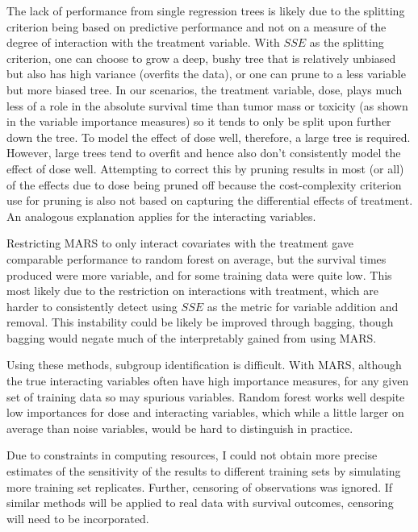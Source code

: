 \documentclass[12pt]{article}
\begin{document}
The lack of performance from single regression trees is likely due to the splitting criterion being based on predictive performance and not on a measure of the degree of interaction with the treatment variable. With $SSE$ as the splitting criterion, one can choose to grow a deep, bushy tree that is relatively unbiased but also has high variance (overfits the data), or one can prune to a less variable but more biased tree. In our scenarios, the treatment variable, dose, plays much less of a role in the absolute survival time than tumor mass or toxicity (as shown in the variable importance measures) so it tends to only be split upon further down the tree. To model the effect of dose well, therefore, a large tree is required. However, large trees tend to overfit and hence also don't consistently model the effect of dose well. Attempting to correct this by pruning results in most (or all) of the effects due to dose being pruned off because the cost-complexity criterion use for pruning is also not based on capturing the differential effects of treatment. An analogous explanation applies for the interacting variables.

Restricting MARS to only interact covariates with the treatment gave comparable performance to random forest on average, but the survival times produced were more variable, and for some training data were quite low. This most likely due to the restriction on interactions with treatment, which are harder to consistently detect using $SSE$ as the metric for variable addition and removal. This instability could be likely be improved through bagging, though bagging would negate much of the interpretably gained from using MARS.

Using these methods, subgroup identification is difficult. With MARS, although the true interacting variables often have high importance measures, for any given set of training data so may spurious variables. Random forest works well despite low importances for dose and interacting variables, which while a little larger on average than noise variables, would be hard to distinguish in practice.

Due to constraints in computing resources, I could not obtain more precise estimates of the sensitivity of the results to different training sets by simulating more training set replicates. Further, censoring of observations was ignored. If similar methods will be applied to real data with survival outcomes, censoring will need to be incorporated.
\end{document}
